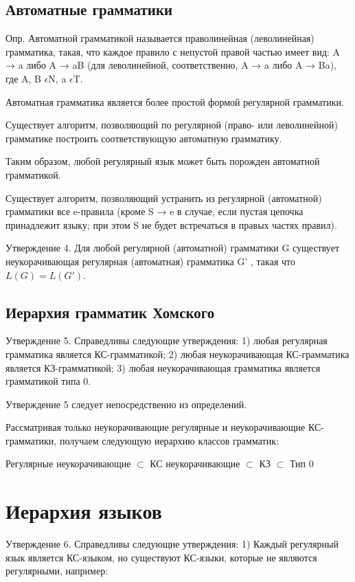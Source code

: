 \documentclass{article}
\begin{document}
\subsection{Автоматные грамматики}

Опр. Автоматной грамматикой называется праволинейная (леволинейная)
грамматика, такая, что каждое правило с непустой правой частью имеет вид:
A → a либо A → aB (для леволинейной, соответственно, A → a либо A → Ba),
где A, B $\epsilon$N, a $\epsilon$T.

Автоматная грамматика является более простой формой регулярной грамматики.

Существует алгоритм, позволяющий по регулярной (право- или леволинейной) грамматике построить соответствующую автоматную грамматику.

Таким образом, любой регулярный язык может быть порожден автоматной
грамматикой.

Существует алгоритм, позволяющий устранить из регулярной (автоматной)
грамматики все e-правила (кроме S → e в случае, если пустая цепочка принадлежит языку; при этом S не будет встречаться в правых частях правил).

Утверждение 4. Для любой регулярной (автоматной) грамматики G существует неукорачивающая регулярная (автоматная) грамматика G'
, такая что $L(G) = L(G')$.

\subsection{Иерархия грамматик Хомского}

Утверждение 5. Справедливы следующие утверждения:
1) любая регулярная грамматика является КС-грамматикой;
2) любая неукорачивающая КС-грамматика является КЗ-грамматикой;
3) любая неукорачивающая грамматика является грамматикой типа 0.

Утверждение 5 следует непосредственно из определений.

Рассматривая только неукорачивающие регулярные и неукорачивающие КС-
грамматики, получаем следующую иерархию классов грамматик:

Регулярные неукорачивающие $\subset$ КС неукорачивающие $\subset$ КЗ $\subset$ Тип 0

\section{Иерархия языков}

Утверждение 6. Справедливы следующие утверждения:
1) Каждый регулярный язык является КС-языком, но существуют КС-языки,
которые не являются регулярными, например:
\end{document}
